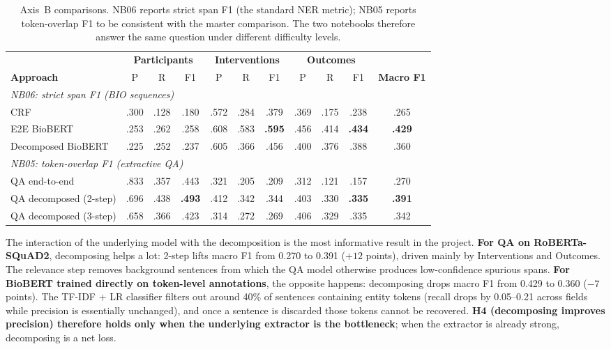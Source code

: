 \documentclass[11pt]{article}
\begin{document}
\begin{table}[tbp]
\centering
\small
\begin{tabular}{lccc|ccc|ccc|c}
\toprule
& \multicolumn{3}{c}{\textbf{Participants}} & \multicolumn{3}{c}{\textbf{Interventions}} & \multicolumn{3}{c}{\textbf{Outcomes}} & \\
\cmidrule(lr){2-4}\cmidrule(lr){5-7}\cmidrule(lr){8-10}
\textbf{Approach} & P & R & F1 & P & R & F1 & P & R & F1 & \textbf{Macro F1} \\
\midrule
\multicolumn{11}{l}{\textit{NB06: strict span F1 (BIO sequences)}}\\
CRF                    & .300 & .128 & .180 & .572 & .284 & .379 & .369 & .175 & .238 & .265 \\
E2E BioBERT            & .253 & .262 & .258 & .608 & .583 & \textbf{.595} & .456 & .414 & \textbf{.434} & \textbf{.429} \\
Decomposed BioBERT     & .225 & .252 & .237 & .605 & .366 & .456 & .400 & .376 & .388 & .360 \\
\midrule
\multicolumn{11}{l}{\textit{NB05: token-overlap F1 (extractive QA)}}\\
QA end-to-end          & .833 & .357 & .443 & .321 & .205 & .209 & .312 & .121 & .157 & .270 \\
QA decomposed (2-step) & .696 & .438 & \textbf{.493} & .412 & .342 & .344 & .403 & .330 & \textbf{.335} & \textbf{.391} \\
QA decomposed (3-step) & .658 & .366 & .423 & .314 & .272 & .269 & .406 & .329 & .335 & .342 \\
\bottomrule
\end{tabular}
\caption{Axis~B comparisons. NB06 reports strict span F1 (the standard
NER metric); NB05 reports token-overlap F1 to be consistent with the
master comparison. The two notebooks therefore answer the same question
under different difficulty levels.}
\label{tab:nb05_nb06}
\end{table}

The interaction of the underlying model with the decomposition is the
most informative result in the project. \textbf{For QA on
RoBERTa-SQuAD2}, decomposing helps a lot: 2-step lifts macro F1 from
0.270 to 0.391 ($+12$ points), driven mainly by Interventions and
Outcomes. The relevance step removes background sentences from which
the QA model otherwise produces low-confidence spurious spans.
\textbf{For BioBERT trained directly on token-level annotations}, the
opposite happens: decomposing drops macro F1 from 0.429 to 0.360
($-7$ points). The TF-IDF + LR classifier filters out around 40\% of
sentences containing entity tokens (recall drops by 0.05--0.21 across
fields while precision is essentially unchanged), and once a sentence
is discarded those tokens cannot be recovered. \textbf{H4 (decomposing
improves precision) therefore holds only when the underlying extractor
is the bottleneck}; when the extractor is already strong, decomposing
is a net loss.
\end{document}
